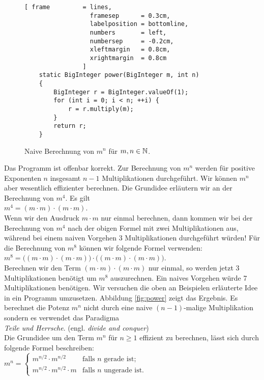 \begin{figure}[!h]
  \centering
\begin{Verbatim}[ frame         = lines, 
                  framesep      = 0.3cm, 
                  labelposition = bottomline,
                  numbers       = left,
                  numbersep     = -0.2cm,
                  xleftmargin   = 0.8cm,
                  xrightmargin  = 0.8cm
                ]
    static BigInteger power(BigInteger m, int n)
    {
        BigInteger r = BigInteger.valueOf(1);
        for (int i = 0; i < n; ++i) {
            r = r.multiply(m);
        } 
        return r;
    }
\end{Verbatim}
\vspace*{-0.3cm}
  \caption{Naive Berechnung von $m^n$ f\"ur $m,n \in {\mathbb N}$.}
  \label{fig:power-naive}
\end{figure} 

Das Programm ist  offenbar korrekt.
Zur Berechnung  von $m^n$ werden f\"ur positive Exponenten $n$ insgesamt $n-1$ Multiplikationen durchgef\"uhrt.
Wir k\"onnen $m^n$ aber wesentlich effizienter berechnen.  Die Grundidee erl\"autern wir an
der Berechnung von $m^4$.  Es gilt \\[0.1cm]
\hspace*{1.3cm} 
$m^4 = (m \cdot m) \cdot (m \cdot m)$.\\[0.1cm]
Wenn wir den Ausdruck $m\cdot m$ nur einmal berechnen, dann kommen wir bei der Berechnung von
$m^4$ nach der obigen Formel mit zwei Multiplikationen aus, w\"ahrend bei einem
naiven Vorgehen 3 Multiplikationen durchgef\"uhrt w\"urden! F\"ur die Berechnung von $m^8$
k\"onnen wir folgende Formel verwenden: \\[0.1cm]
\hspace*{1.3cm} 
$m^8 = \bigl( (m \cdot m) \cdot (m \cdot m) \bigr) \cdot \bigl( (m \cdot m) \cdot (m \cdot m) \bigr)$. \\[0.1cm]
Berechnen wir den Term $(m \cdot m) \cdot (m \cdot m)$ nur einmal, so werden jetzt 3 Multiplikationen
ben\"otigt um $m^8$ auszurechnen.  Ein naives Vorgehen w\"urde 7 Multiplikationen ben\"otigen.
Wir versuchen die oben an Beispielen erl\"auterte Idee in ein Programm umzusetzen.
Abbildung \ref{fig:power} zeigt das Ergebnis.  Es berechnet die Potenz $m^n$ nicht durch eine
naive $(n-1)$-malige Multiplikation sondern es verwendet das Paradigma \\[0.1cm]
\hspace*{1.3cm} \emph{Teile und Herrsche}. \quad (engl. \emph{divide and conquer})
\\[0.1cm]
Die Grundidee um den Term $m^n$ f\"ur $n \geq 1$ effizient zu berechnen,
l\"asst sich durch folgende Formel beschreiben: \\[0.1cm] 
\hspace*{1.3cm} 
$m^n = 
\left\{\begin{array}{ll}
m^{n/2} \cdot m^{n/2}      & \mbox{falls $n$ gerade ist};    \\
m^{n/2} \cdot m^{n/2} \cdot m  & \mbox{falls $n$ ungerade ist}.
\end{array}
\right.
$


